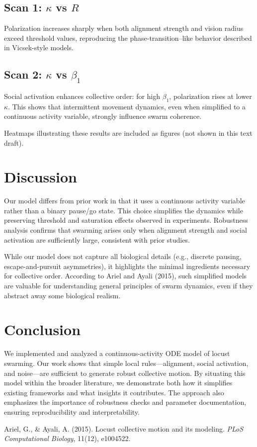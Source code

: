 \documentclass[11pt,a4paper]{article}
\begin{document}
\subsection{Scan 1: $\kappa$ vs $R$}
Polarization increases sharply when both alignment strength and vision radius exceed threshold values, reproducing the phase-transition–like behavior described in Vicsek-style models.

\subsection{Scan 2: $\kappa$ vs $\beta_1$}
Social activation enhances collective order: for high $\beta_1$, polarization rises at lower $\kappa$. This shows that intermittent movement dynamics, even when simplified to a continuous activity variable, strongly influence swarm coherence.

Heatmaps illustrating these results are included as figures (not shown in this text draft).

\section{Discussion}

Our model differs from prior work in that it uses a continuous activity variable rather than a binary pause/go state. This choice simplifies the dynamics while preserving threshold and saturation effects observed in experiments. Robustness analysis confirms that swarming arises only when alignment strength and social activation are sufficiently large, consistent with prior studies.

While our model does not capture all biological details (e.g., discrete pausing, escape-and-pursuit asymmetries), it highlights the minimal ingredients necessary for collective order. According to Ariel and Ayali (2015), such simplified models are valuable for understanding general principles of swarm dynamics, even if they abstract away some biological realism.

\section{Conclusion}

We implemented and analyzed a continuous-activity ODE model of locust swarming. Our work shows that simple local rules—alignment, social activation, and noise—are sufficient to generate robust collective motion. By situating this model within the broader literature, we demonstrate both how it simplifies existing frameworks and what insights it contributes. The approach also emphasizes the importance of robustness checks and parameter documentation, ensuring reproducibility and interpretability.

\begin{thebibliography}{9}
Ariel, G., \& Ayali, A. (2015). Locust collective motion and its modeling. \emph{PLoS Computational Biology}, 11(12), e1004522.
\end{thebibliography}
\end{document}
